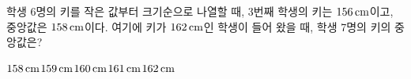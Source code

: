 학생 6명의 키를 작은 값부터 크기순으로 나열할 때, 3번째 학생의 키는 $156\mkern3mu \mathrm{cm}$이고, 중앙값은 $158\mkern3mu \mathrm{cm}$이다. 여기에 키가 $162\mkern3mu \mathrm{cm}$인 학생이 들어 왔을 때, 학생 7명의 키의 중앙값은?
\begin{choices32}{$158\mkern3mu \mathrm{cm}$}{$159\mkern3mu \mathrm{cm}$}{$160\mkern3mu \mathrm{cm}$}{$161\mkern3mu \mathrm{cm}$}{$162\mkern3mu \mathrm{cm}$}\end{choices32}

